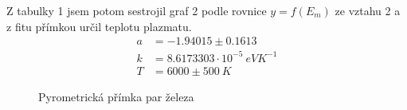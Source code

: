 \documentclass[a4paper,11pt]{article}
\begin{document}
\begin{table}[htpb]
    \begin{minipage}[b]{.65\linewidth}

Z tabulky 1 jsem potom sestrojil graf 2 podle rovnice $ y = f(E_m) $ ze vztahu 2 a z fitu přímkou určil teplotu plazmatu.
\begin{align*}
    a &= -1.94015 \pm 0.1613     \\
    k &= 8.6173303 \cdot 10^{-5} \ eV K^{-1} \\
    T &= 6000 \pm 500 \ K
\end{align*}
\vspace{-30pt}
\begin{figure}[H]
    \centering
    
    \captionsetup{type=graph}
    \caption{Pyrometrická přímka par železa}
\end{figure}

    \end{minipage} 
    \hfill
    \begin{minipage}[b]{.3\linewidth}
        \centering


\end{minipage}
\end{table}
\end{document}
